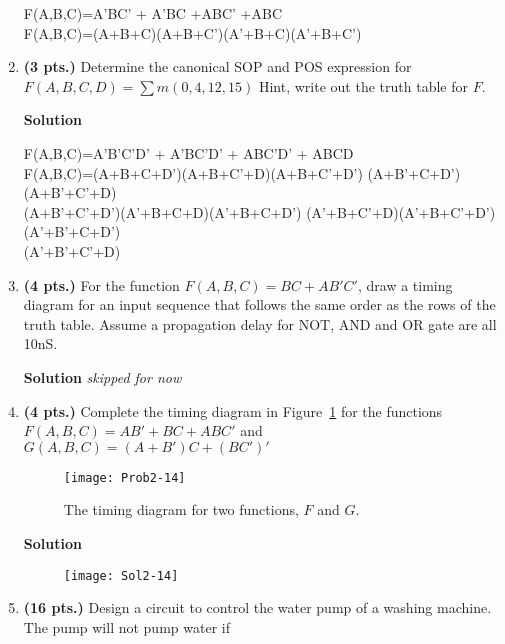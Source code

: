 \begin{enumerate}
\begin{onlysolution}
F(A,B,C)=A'BC' + A'BC +ABC' +ABC  \\
F(A,B,C)=(A+B+C)(A+B+C')(A'+B+C)(A'+B+C')
\end{onlysolution}

\item \textbf{ (3 pts.)} Determine the canonical SOP and POS expression for 
$F(A,B,C,D) = \sum m(0,4,12,15)$ Hint, write out the truth table for $F$.

\begin{onlysolution}  \textbf{Solution} \itshape

F(A,B,C)=A'B'C'D' + A'BC'D' + ABC'D' + ABCD  \\
F(A,B,C)=(A+B+C+D')(A+B+C'+D)(A+B+C'+D') (A+B'+C+D')(A+B'+C'+D) \\
(A+B'+C'+D')(A'+B+C+D)(A'+B+C+D') (A'+B+C'+D)(A'+B+C'+D')(A'+B'+C+D')\\
(A'+B'+C'+D)
\end{onlysolution}

\item \textbf{ (4 pts.)} For the function $F(A,B,C)= BC+AB'C'$,  draw
a timing diagram for an input sequence that follows the same order 
as the rows of the truth table.  Assume a propagation delay for NOT, 
AND and OR gate are all 10nS.

\begin{onlysolution}  \textbf{Solution} \itshape 
skipped for now
\end{onlysolution}

\item \textbf{ (4 pts.)} Complete the timing diagram in Figure~\ref{fig:HWtime}
for the functions
$F(A,B,C) = AB' + BC + ABC'$ and $G(A,B,C) = (A+B')C + (BC')'$
\begin{figure}[ht]
\texttt{[image: Prob2-14]}
\caption{The timing diagram for two functions, $F$ and $G$.}
\label{fig:HWtime}
\end{figure}

\begin{onlysolution}  \textbf{Solution} \itshape

\begin{figure}[ht]
\texttt{[image: Sol2-14]}
\end{figure}
\end{onlysolution}

\item\textbf{ (16 pts.)} Design a circuit to control
the water pump of a washing machine.  The pump will not pump 
water if
                                                                                

\end{enumerate}
